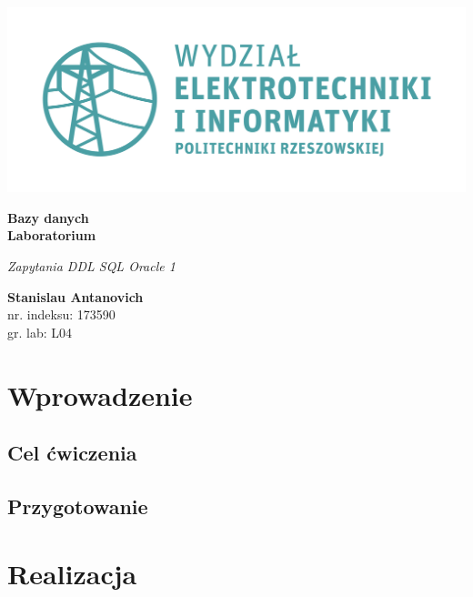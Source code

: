 \documentclass{article}
\begin{document}
\begin{titlepage}
\begin{center}
	\includegraphics[scale=0.7]{logo.png}

	\vspace*{4cm}
	\textbf{Bazy danych\\ Laboratorium}

	\vspace{1.5cm}
	\textit{Zapytania DDL SQL Oracle 1}

	\vspace{1.5cm}
	\textbf{Stanislau Antanovich}\\
	nr. indeksu: 173590\\
	gr. lab: L04

	\vspace{4.5cm}
\end{center}
\end{titlepage}

\tableofcontents
\listoffigures
\lstlistoflistings

\newpage
 
\section{Wprowadzenie}

\subsection{Cel ćwiczenia}

\blindtext
\subsection{Przygotowanie}

\blindtext

\section{Realizacja}
\end{document}
